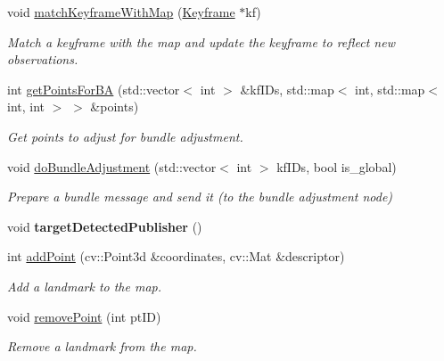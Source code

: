 \begin{DoxyCompactItemize}
\mbox{\label{classMap_a7657dddc73848fb09e09c1f4340e9618}} 
void \hyperlink{classMap_a7657dddc73848fb09e09c1f4340e9618}{match\+Keyframe\+With\+Map} (\hyperlink{classKeyframe}{Keyframe} $\ast$kf)
\begin{DoxyCompactList}\small\item\em Match a keyframe with the map and update the keyframe to reflect new observations. \end{DoxyCompactList}\item 
int \hyperlink{classMap_aab50e2ea33f3ea247488990047951987}{get\+Points\+For\+BA} (std\+::vector$<$ int $>$ \&kf\+I\+Ds, std\+::map$<$ int, std\+::map$<$ int, int $>$ $>$ \&points)
\begin{DoxyCompactList}\small\item\em Get points to adjust for bundle adjustment. \end{DoxyCompactList}\item 
void \hyperlink{classMap_ad516c23a920c67aecee60a52acc09c98}{do\+Bundle\+Adjustment} (std\+::vector$<$ int $>$ kf\+I\+Ds, bool is\+\_\+global)
\begin{DoxyCompactList}\small\item\em Prepare a bundle message and send it (to the bundle adjustment node) \end{DoxyCompactList}\item 
\mbox{\label{classMap_a32f9567481df1e6960610a83b7f0064b}} 
void {\bfseries target\+Detected\+Publisher} ()
\item 
\mbox{\label{classMap_a41fbdde09e8108430000882355fc79ad}} 
int \hyperlink{classMap_a41fbdde09e8108430000882355fc79ad}{add\+Point} (cv\+::\+Point3d \&coordinates, cv\+::\+Mat \&descriptor)
\begin{DoxyCompactList}\small\item\em Add a landmark to the map. \end{DoxyCompactList}\item 
\mbox{\label{classMap_adea14ee9f987c9bb6d242cb5e439bbd7}} 
void \hyperlink{classMap_adea14ee9f987c9bb6d242cb5e439bbd7}{remove\+Point} (int pt\+ID)
\begin{DoxyCompactList}\small\item\em Remove a landmark from the map. \end{DoxyCompactList}\item 

\end{DoxyCompactItemize}
